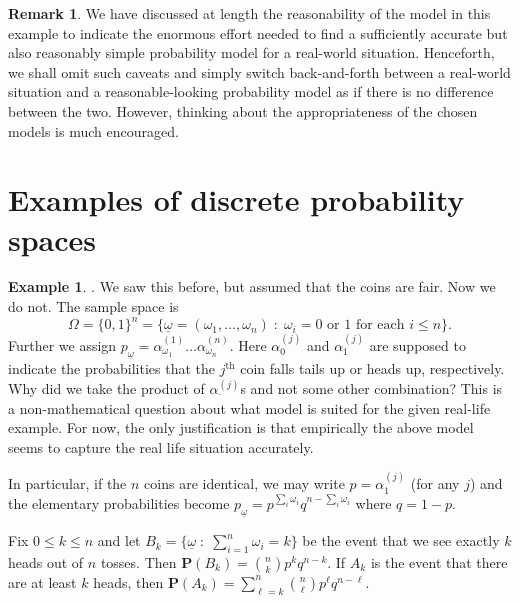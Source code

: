 \documentclass[preprint,  11pt]{amsart}
\newcommand{\parag}[1]{\vspace{4mm}\noindent{\bfseries #1}}
\def\ome{\omega}
\theoremstyle{plain} %
\theoremstyle{definition} %
\newtheorem{remark}[theorem]{Remark}
\newtheorem{example}[theorem]{Example}
\begin{document}
{\begin{remark} We have discussed at length the reasonability of the model in this example to indicate the enormous effort needed to find a sufficiently  accurate but also reasonably simple probability model for a real-world situation. Henceforth, we shall omit such caveats and simply switch back-and-forth between a real-world situation and a reasonable-looking probability model as if there is no difference between the two. However, thinking about the appropriateness of the chosen models is much encouraged.
\end{remark}

\section{Examples of discrete probability spaces}
\begin{example} \parag{Toss $n$ coins}. We saw this before, but assumed that the coins are fair. Now we do not. The sample space is
$$
\Omega=\{0,1\}^{n}=\{\underline{\ome}=(\omega_{1},\ldots ,\omega_{n}){\; : \;} \omega_{i}=0 \mbox{ or } 1 \mbox{ for each }i\le n\}.
$$
Further we assign $p_{\underline{\ome}}=\alpha_{\omega_{1}}^{(1)}\ldots \alpha_{\omega_{n}}^{(n)}$. Here $\alpha_{0}^{(j)}$ and $\alpha_{1}^{(j)}$ are supposed to indicate the probabilities that the $j^{\mbox{th}}$ coin falls tails up or heads up, respectively. Why did we take the product of $\alpha^{(j)}_{\cdot}$s and not some other combination? This is a non-mathematical question about what model is suited for the given real-life example. For now, the only justification is that empirically the above model seems to capture the real life situation accurately.

In particular, if the $n$ coins are identical, we may write $p=\alpha_{1}^{(j)}$ (for any $j$) and the elementary probabilities become  $p_{\underline{\ome}}=p^{\sum_{i}\omega_{i}}q^{n-\sum_{i}\omega_{i}}$ where $q=1-p$.

Fix $0\le k\le n$ and let $B_{k}=\{\underline{\ome}{\; : \;} \sum_{i=1}^{n}\omega_{i}=k\}$ be the event that we see exactly $k$ heads out of $n$ tosses. Then $\mathbf{P}(B_{k})=\binom{n}{k}p^{k}q^{n-k}$. If $A_{k}$ is the event that there are at least $k$ heads, then
$\mathbf{P}(A_{k})=\sum\limits_{\ell=k}^{n}\binom{n}{\ell}p^{\ell}q^{n-\ell}$.
\end{example}

}
\end{document}
